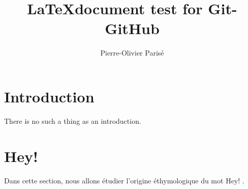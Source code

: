 \documentclass[12pt,a4paper]{article}
\title{\LaTeX document test for Git-GitHub}
\author{Pierre-Olivier Parisé}
\begin{document}
\maketitle

\section{Introduction}
There is no such a thing as an introduction. 

\section{Hey!}
Dans cette section, nous allons étudier l'origine éthymologique du mot \og Hey! \fg{}.
\end{document}
